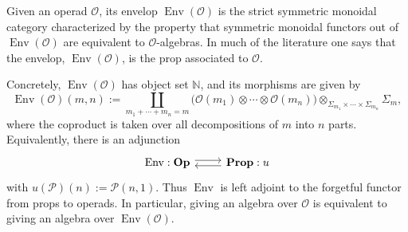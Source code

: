 \documentclass{amsart}
\newcommand{\calO}{\mathcal{O}}
\newcommand{\calP}{\mathcal{P}}
\newcommand{\Op}{\mathbf{Op}}
\newcommand{\Env}{\operatorname{Env}}
\theoremstyle{definition}
\numberwithin{equation}{section}
\begin{document}
Given an operad $\calO$, its envelop $\Env(\calO)$ is the strict symmetric monoidal category characterized by the property that symmetric monoidal functors out of $\Env(\calO)$ are equivalent to $\calO$-algebras. In much of the literature one says that the envelop, $\Env(\calO)$, is the prop associated to $\calO$.

Concretely, $\Env(\calO)$ has object set $\mathbb N$, and its morphisms are given by
\begin{equation}\label{eq:envolepe}
\Env(\calO)(m,n)
:=
\coprod_{m_1+\cdots +m_n=m}
\bigl(\calO(m_1)\otimes\cdots\otimes \calO(m_n)\bigr)\otimes_{\Sigma_{m_1}\times\cdots\times\Sigma_{m_n}}\Sigma_m,
\end{equation}
where the coproduct is taken over all decompositions of $m$ into $n$ parts. Equivalently, there is an adjunction
\[\begin{tikzcd}
\Env : \Op \arrow[r, shift left=1] & \mathbf{Prop} \arrow[l, shift left=1] : u
\end{tikzcd}
\]
with $u(\calP)(n):=\calP(n,1).$ Thus $\Env$ is left adjoint to the forgetful functor from props to operads. In particular, giving an algebra over $\calO$ is equivalent to giving an algebra over $\Env(\calO)$.

\end{document}

